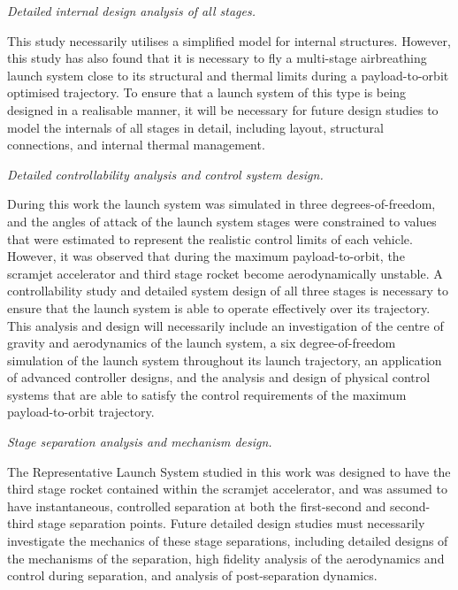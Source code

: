\vspace{10pt}
\textit{Detailed internal design analysis of all stages.}

\noindent
This study necessarily utilises a simplified model for internal structures. However, this study has also found that it is necessary to fly a multi-stage airbreathing launch system close to its structural and thermal limits during a payload-to-orbit optimised trajectory. To ensure that a launch system of this type is being designed in a realisable manner, it will be necessary for future design studies to model the internals of all stages in detail, including layout, structural connections, and internal thermal management.  

\vspace{10pt}
	\textit{Detailed controllability analysis and control system design.}

\noindent
During this work the launch system was simulated in three degrees-of-freedom, and the angles of attack of the launch system stages were constrained to values that were estimated to represent the realistic control limits of each vehicle. However, it was observed that during the maximum payload-to-orbit, the scramjet accelerator and third stage rocket become aerodynamically unstable.
A controllability study and detailed system design of all three stages is necessary to ensure that the launch system is able to operate effectively over its trajectory. This analysis and design will necessarily include an investigation of the centre of gravity and aerodynamics of the launch system, a six degree-of-freedom simulation of the launch system throughout its launch trajectory, an application of advanced controller designs, and the analysis and design of physical control systems that are able to satisfy the control requirements of the maximum payload-to-orbit trajectory. 


\vspace{10pt}
	\textit{Stage separation analysis and mechanism design.}
	
\noindent
The Representative Launch System studied in this work was designed to have the third stage rocket contained within the scramjet accelerator, and was assumed to have instantaneous, controlled separation at both the first-second and second-third stage separation points. Future detailed design studies must necessarily investigate the mechanics of these stage separations, including detailed designs of the mechanisms of the separation, high fidelity analysis of the aerodynamics and control during separation, and analysis of post-separation dynamics.


